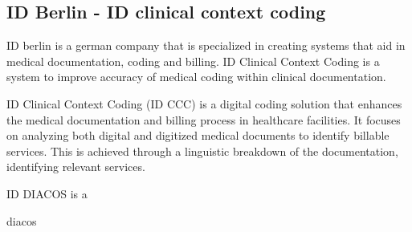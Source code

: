 \subsection{ID Berlin - ID clinical context coding}\label{subsec:id-berlin---id-clinical-context-coding}
ID berlin is a german company that is specialized in creating systems that aid in medical documentation, coding and billing.
ID Clinical Context Coding is a system to improve accuracy of medical coding within clinical documentation.



ID Clinical Context Coding (ID CCC) is a digital coding solution that enhances the medical documentation and billing process in healthcare facilities.
It focuses on analyzing both digital and digitized medical documents to identify billable services.
This is achieved through a linguistic breakdown of the documentation, identifying relevant services. \cite{Diekmann2008}

ID DIACOS is a


diacos \cite{10.1007/978-3-642-82852-2_111}
